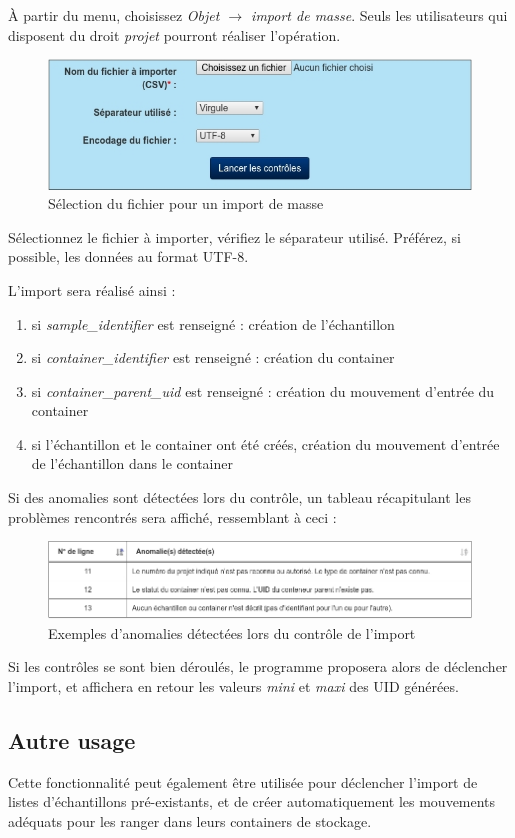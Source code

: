 À partir du menu, choisissez \textit{Objet $\rightarrow$ import de masse}. Seuls les utilisateurs qui disposent du droit \textit{projet} pourront réaliser l'opération.
\begin{figure}[H]
\includegraphics[width=\linewidth]{images/import_controle}
\caption{Sélection du fichier pour un import de masse}
\end{figure}

Sélectionnez le fichier à importer, vérifiez le séparateur utilisé. Préférez, si possible, les données au format UTF-8.

L'import sera réalisé ainsi :
\begin{enumerate}
\item si \textit{sample\_identifier} est renseigné : création de l'échantillon
\item si \textit{container\_identifier} est renseigné : création du container
\item si \textit{container\_parent\_uid} est renseigné : création du mouvement d'entrée du container
\item si l'échantillon et le container ont été créés, création du mouvement d'entrée de l'échantillon dans le container
\end{enumerate}

Si des anomalies sont détectées lors du contrôle, un tableau récapitulant les problèmes rencontrés sera affiché, ressemblant à ceci :
\begin{figure}[H]
\includegraphics[width=\linewidth]{images/import_tableau}
\caption{Exemples d'anomalies détectées lors du contrôle de l'import}
\end{figure}

Si les contrôles se sont bien déroulés, le programme proposera alors de déclencher l'import, et affichera en retour les valeurs \textit{mini} et \textit{maxi} des UID générées.

\subsection{Autre usage}
Cette fonctionnalité peut également être utilisée pour déclencher l'import de listes d'échantillons pré-existants, et de créer automatiquement les mouvements adéquats pour les ranger dans leurs containers de stockage.